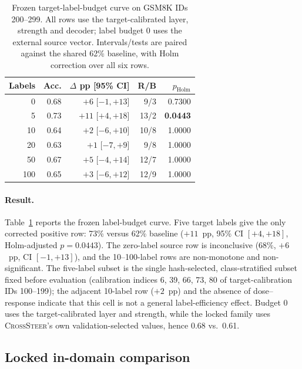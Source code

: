 \begin{table}[tbp]
\centering
\scriptsize
\setlength{\tabcolsep}{2.5pt}
\caption{Frozen target-label-budget curve on GSM8K IDs 200--299.  All rows
use the target-calibrated layer, strength and decoder; label budget 0 uses the
external source vector.  Intervals/tests are paired against the shared 62\%
baseline, with Holm correction over all six rows.}
\label{tab:label-efficiency}
\begin{tabular}{@{}rrrrr@{}}
\toprule
Labels & Acc. & $\Delta$ pp [95\% CI] & R/B & $p_{\mathrm{Holm}}$ \\
\midrule
0 & 0.68 & $+6$ [$-1,+13$] & 9/3 & 0.7300 \\
5 & 0.73 & $+11$ [$+4,+18$] & 13/2 & \textbf{0.0443} \\
10 & 0.64 & $+2$ [$-6,+10$] & 10/8 & 1.0000 \\
20 & 0.63 & $+1$ [$-7,+9$] & 9/8 & 1.0000 \\
50 & 0.67 & $+5$ [$-4,+14$] & 12/7 & 1.0000 \\
100 & 0.65 & $+3$ [$-6,+12$] & 12/9 & 1.0000 \\
\bottomrule
\end{tabular}
\end{table}

\paragraph{Result.}
Table~\ref{tab:label-efficiency} reports the frozen label-budget
curve.  Five target labels give the only corrected positive row: 73\% versus 62\%
baseline ($+11$~pp, 95\% CI $[+4,+18]$, Holm-adjusted $p=0.0443$).  The
zero-label source row is inconclusive (68\%, $+6$~pp, CI $[-1,+13]$), and the
10--100-label rows are non-monotone and non-significant.  The five-label
subset is the single hash-selected, class-stratified subset fixed before
evaluation (calibration indices 6, 39, 66, 73, 80 of target-calibration IDs
100--199); the adjacent 10-label row ($+2$~pp) and the absence
of dose--response indicate that this cell is not a general label-efficiency
effect.  Budget 0 uses the target-calibrated layer and strength, while the
locked family uses
\textsc{CrossSteer}'s own validation-selected values, hence 0.68 vs.\ 0.61.

\subsection{Locked in-domain comparison}
\label{sec:crosssteer-results}

